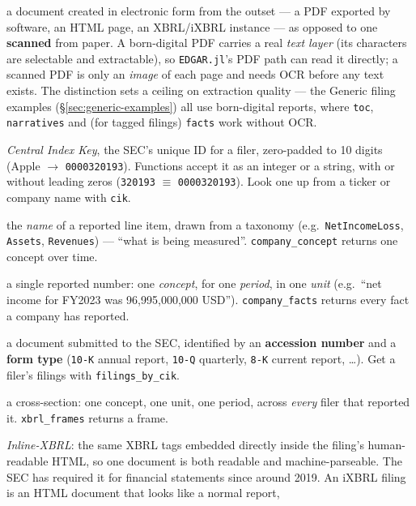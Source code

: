 \documentclass[11pt,a4paper]{report}
\begin{document}
\begin{description}[leftmargin=1.4em,style=nextline,itemsep=2pt]
  \item[Born-digital] a document created in electronic form from the outset --- a PDF exported by
    software, an HTML page, an XBRL/iXBRL instance --- as opposed to one \textbf{scanned} from paper. A
    born-digital PDF carries a real \emph{text layer} (its characters are selectable and extractable), so
    \texttt{EDGAR.jl}'s PDF path can read it directly; a scanned PDF is only an \emph{image} of each page and
    needs OCR before any text exists. The distinction sets a ceiling on extraction quality --- the Generic
    filing examples (\S\ref{sec:generic-examples}) all use born-digital reports, where \texttt{toc},
    \texttt{narratives} and (for tagged filings) \texttt{facts} work without OCR.
  \item[CIK] \emph{Central Index Key}, the SEC's unique ID for a filer,
    zero-padded to 10 digits (Apple $\to$ \texttt{0000320193}). Functions accept it
    as an integer or a string, with or without leading zeros (\texttt{320193}
    $\equiv$ \texttt{0000320193}). Look one up from a ticker or company name with
    \texttt{cik}.
  \item[Concept] the \emph{name} of a reported line item, drawn from a taxonomy
    (e.g.\ \texttt{NetIncomeLoss}, \texttt{Assets}, \texttt{Revenues}) --- ``what is
    being measured''. \texttt{company\_concept} returns one concept over time.
  \item[Fact] a single reported number: one \emph{concept}, for one
    \emph{period}, in one \emph{unit} (e.g.\ ``net income for FY2023 was
    96{,}995{,}000{,}000 USD''). \texttt{company\_facts} returns every fact a
    company has reported.
  \item[Filing] a document submitted to the SEC, identified by an
    \textbf{accession number} and a \textbf{form type} (\texttt{10-K} annual
    report, \texttt{10-Q} quarterly, \texttt{8-K} current report, \dots). Get a filer's filings with \texttt{filings\_by\_cik}.
  \item[Frame] a cross-section: one concept, one unit, one period, across
    \emph{every} filer that reported it. \texttt{xbrl\_frames} returns a frame.
  \item[iXBRL] \emph{Inline-XBRL}: the same XBRL tags embedded directly inside the filing's human-readable HTML, so one document is both readable and
machine-parseable. The SEC has required it for financial statements since
around 2019. An iXBRL filing is an HTML document that looks like a normal report,

\end{description}
\end{document}
